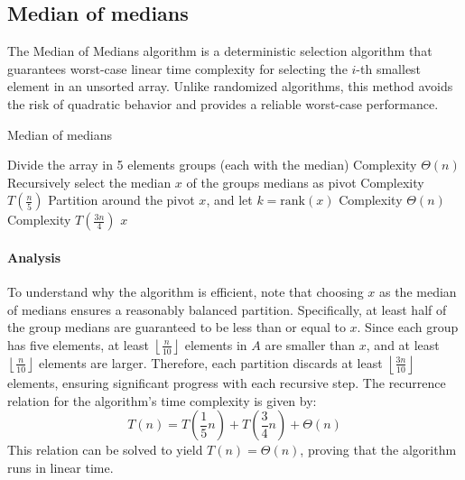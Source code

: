 \subsection{Median of medians}
The Median of Medians algorithm is a deterministic selection algorithm that guarantees worst-case linear time complexity for selecting the $i$-th smallest element in an unsorted array.
Unlike randomized algorithms, this method avoids the risk of quadratic behavior and provides a reliable worst-case performance.
\begin{algorithm}[H]
    \caption{Median of medians}
    \begin{algorithmic}[1]
            \State Divide the array in 5 elements groups (each with the median) \Comment Complexity $\Theta(n)$
            \State Recursively select the median $x$ of the groups medians as pivot \Comment Complexity $T\left(\frac{n}{5}\right)$
            \State Partition around the pivot $x$, and let $k = \text{rank}(x)$ \Comment Complexity $\Theta(n)$
             \Comment Complexity $T\left(\frac{3n}{4}\right)$
                \State \Return $x$ 
                \State {}
            \Else 
                \State {}
            \EndIf
        \EndFunction
    \end{algorithmic}
\end{algorithm}  

\paragraph*{Analysis}
To understand why the algorithm is efficient, note that choosing $x$ as the median of medians ensures a reasonably balanced partition.
Specifically, at least half of the group medians are guaranteed to be less than or equal to $x$.
Since each group has five elements, at least $\left\lfloor\frac{n}{10}\right\rfloor$ elements in $A$ are smaller than $x$, and at least $\left\lfloor\frac{n}{10}\right\rfloor$ elements are larger. 
Therefore, each partition discards at least $\left\lfloor\frac{3n}{10}\right\rfloor$ elements, ensuring significant progress with each recursive step.
The recurrence relation for the algorithm's time complexity is given by:
\[T(n)=T\left(\dfrac{1}{5}n\right)+T\left(\dfrac{3}{4}n\right)+\Theta(n)\]
This relation can be solved to yield $T(n)=\Theta(n)$, proving that the algorithm runs in linear time.

